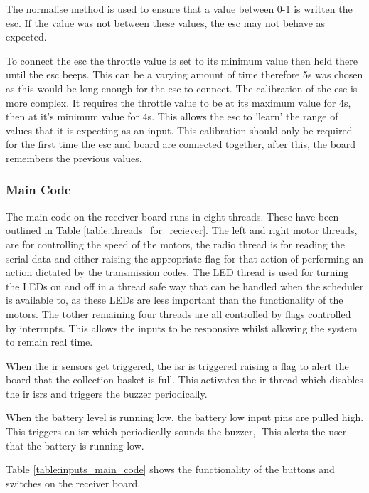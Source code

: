 \documentclass [11pt]{article}
\begin{document}
The normalise method is used to ensure that a value between 0-1 is written the \gls{esc}. If the value was not between these values, the \gls{esc} may not behave as expected. 

To connect the \gls{esc} the throttle value is set to its minimum value then held there until the \gls{esc} beeps. This can be a varying amount of time therefore 5s was chosen as this would be long enough for the \gls{esc} to connect. The calibration of the \gls{esc} is more complex. It requires the throttle value to be at its maximum value for 4s, then at it's minimum value for 4s. This allows the \gls{esc} to 'learn' the range of values that it is expecting as an input. This calibration should only be required for the first time the \gls{esc} and board are connected together, after this, the board remembers the previous values.

\subsubsection{Main Code}

The main code on the receiver board runs in eight threads. These have been outlined in Table \ref{table:threads_for_reciever}. The left and right motor threads, are for controlling the speed of the motors, the radio thread is for reading the serial data and either raising the appropriate flag for that action of performing an action dictated by the transmission codes. The LED thread is used for turning the LEDs on and off in a thread safe way that can be handled when the scheduler is available to, as these LEDs are less important than the functionality of the motors. The tother remaining four threads are all controlled by flags controlled by interrupts. This allows the inputs to be responsive whilst allowing the system to remain real time. 

When the \gls{ir} sensors get triggered, the \gls{isr} is triggered raising a flag to alert the board that the collection basket is full. This activates the \gls{ir} thread which disables the \gls{ir} \gls{isr}s and triggers the buzzer periodically. 

When the battery level is running low, the battery low input pins are pulled high. This triggers an \gls{isr} which periodically sounds the buzzer,. This alerts the user that the battery is running low.  

Table \ref{table:inputs_main_code} shows the functionality of the buttons and switches on the receiver board. 
\end{document}

